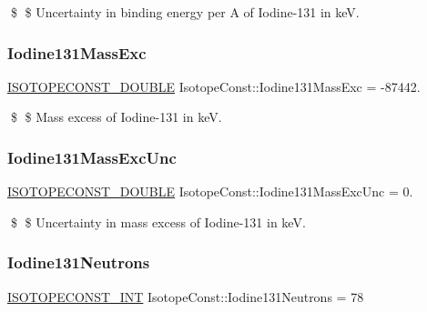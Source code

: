 \$ \$ Uncertainty in binding energy per A of Iodine-\/131 in keV. \mbox{\label{group___isotope_const-_iodine-_i131_ga6fe09dad4d2a17aab484225f1d751194}} 
\subsubsection{\texorpdfstring{Iodine131\+Mass\+Exc}{Iodine131MassExc}}
{\footnotesize\ttfamily \mbox{\hyperlink{group___isotope_const-_macros_ga8f45a7272ce02c0b4c65c44636ed719a}{I\+S\+O\+T\+O\+P\+E\+C\+O\+N\+S\+T\+\_\+\+D\+O\+U\+B\+LE}} Isotope\+Const\+::\+Iodine131\+Mass\+Exc = -\/87442.}

\$ \$ Mass excess of Iodine-\/131 in keV. \mbox{\label{group___isotope_const-_iodine-_i131_ga83bd9cadfb2e160c056c39257ee6b0c8}} 
\subsubsection{\texorpdfstring{Iodine131\+Mass\+Exc\+Unc}{Iodine131MassExcUnc}}
{\footnotesize\ttfamily \mbox{\hyperlink{group___isotope_const-_macros_ga8f45a7272ce02c0b4c65c44636ed719a}{I\+S\+O\+T\+O\+P\+E\+C\+O\+N\+S\+T\+\_\+\+D\+O\+U\+B\+LE}} Isotope\+Const\+::\+Iodine131\+Mass\+Exc\+Unc = 0.}

\$ \$ Uncertainty in mass excess of Iodine-\/131 in keV. \mbox{\label{group___isotope_const-_iodine-_i131_gaea7c6ba042736c884eb5840fe29a6c78}} 
\subsubsection{\texorpdfstring{Iodine131\+Neutrons}{Iodine131Neutrons}}
{\footnotesize\ttfamily \mbox{\hyperlink{group___isotope_const-_macros_ga5f18360b3e99483a35c32d789e62621c}{I\+S\+O\+T\+O\+P\+E\+C\+O\+N\+S\+T\+\_\+\+I\+NT}} Isotope\+Const\+::\+Iodine131\+Neutrons = 78}


